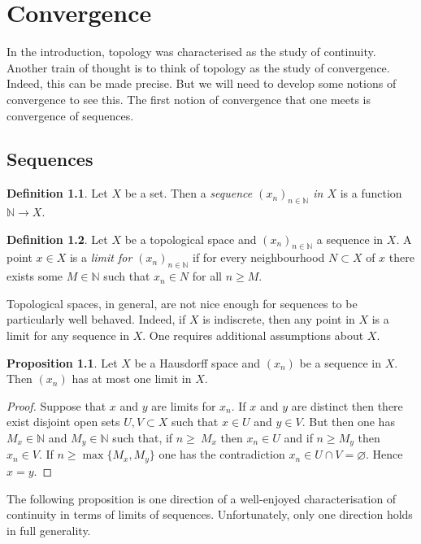 \documentclass{book}
\theoremstyle{definition}
\newtheorem{proposition}{Proposition}[section]
\newtheorem{definition}{Definition}[section]
\theoremstyle{remark}
\newcommand{\N}{\mathbb{N}}
\begin{document}
\chapter{Convergence}
In the introduction, topology was characterised as the study of continuity. Another train of thought is to think of topology as the study of convergence. Indeed, this can be made precise. But we will need to develop some notions of convergence to see this. The first notion of convergence that one meets is convergence of sequences.

\section{Sequences}
\begin{definition}
Let $X$ be a set. Then a \textit{sequence $(x_n)_{n\in\N}$ in $X$} is a function $\N\to X$.
\end{definition}

\begin{definition}
Let $X$ be a topological space and $(x_n)_{n\in\N}$ a sequence in $X$. A point $x\in X$ is a \textit{limit for $(x_n)_{n\in\N}$} if for every neighbourhood $N\subset X$ of $x$ there exists some $M\in\N$ such that $x_n\in N$ for all $n\geq M$.
\end{definition}

Topological spaces, in general, are not nice enough for sequences to be particularly well behaved. Indeed, if $X$ is indiscrete, then any point in $X$ is a limit for any sequence in $X$. One requires additional assumptions about $X$.

\begin{proposition}
Let $X$ be a Hausdorff space and $(x_n)$ be a sequence in $X$. Then $(x_n)$ has at most one limit in $X$.
\end{proposition}
\begin{proof}
Suppose that $x$ and $y$ are limits for $x_n$. If $x$ and $y$ are distinct then there exist disjoint open sets $U,V\subset X$ such that $x\in U$ and $y\in V$. But then one has $M_x\in\N$ and $M_y\in\N$ such that, if $n\geq\ M_x$ then $x_n\in U$ and if $n\geq M_y$ then $x_n\in V$. If $n\geq\max\{M_x,M_y\}$ one has the contradiction $x_n\in U\cap V=\varnothing$. Hence $x=y$.
\end{proof}

The following proposition is one direction of a well-enjoyed characterisation of continuity in terms of limits of sequences. Unfortunately, only one direction holds in full generality.
\end{document}
